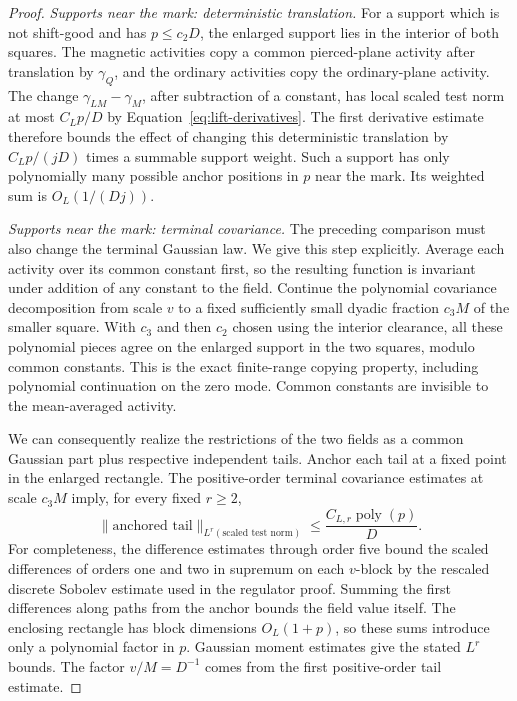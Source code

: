 \begin{proof}
\emph{Supports near the mark: deterministic translation.}
For a support which is not shift-good and has $p\leq c_2D$, the
enlarged support lies in the interior of both squares.  The magnetic
activities copy a common pierced-plane activity after translation by
$\gamma_Q$, and the ordinary activities copy the ordinary-plane
activity.  The change $\gamma_{LM}-\gamma_M$, after subtraction of a
constant, has local scaled test norm at most $C_Lp/D$ by
Equation~\eqref{eq:lift-derivatives}.  The first derivative estimate therefore
bounds the effect of changing this deterministic translation by
$C_Lp/(jD)$ times a summable support weight.  Such a support has only
polynomially many possible anchor positions in $p$ near the mark.
Its weighted sum is $O_L(1/(Dj))$.

\emph{Supports near the mark: terminal covariance.}
The preceding comparison must also change the terminal Gaussian law.
We give this step explicitly.  Average each activity over its common
constant first, so the resulting function is invariant under addition
of any constant to the field.  Continue the polynomial covariance
decomposition from scale $v$ to a fixed sufficiently small dyadic
fraction $c_3M$ of the smaller square.  With $c_3$ and then $c_2$
chosen using the interior clearance, all these polynomial pieces agree
on the enlarged support in the two squares, modulo common constants.
This is the exact finite-range copying property, including polynomial
continuation on the zero mode.  Common constants are invisible to the
mean-averaged activity.

We can consequently realize the restrictions of the two fields as a
common Gaussian part plus respective independent tails.  Anchor each
tail at a fixed point in the enlarged rectangle.  The positive-order
terminal covariance estimates at scale $c_3M$ imply, for every fixed
$r\geq2$,
\begin{equation}
 \bigl\|\text{anchored tail}\bigr\|_{L^r(\text{scaled test norm})}
       \leq \frac{C_{L,r}\operatorname{poly}(p)}D.
 \label{eq:terminal-tail}
\end{equation}
For completeness, the difference estimates through order five bound
the scaled differences of orders one and two in supremum on each
$v$-block by the rescaled discrete Sobolev estimate used in the
regulator proof.  Summing the first differences along paths from the
anchor bounds the field value itself.  The enclosing rectangle has
block dimensions $O_L(1+p)$, so these sums introduce only a polynomial
factor in $p$.  Gaussian moment estimates give the stated $L^r$
bounds.  The factor $v/M=D^{-1}$ comes from the first positive-order
tail estimate.


\end{proof}
